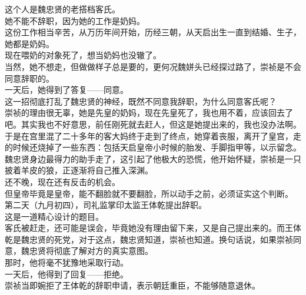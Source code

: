 \begin{multicols}{\theparacolNo}
这个人是魏忠贤的老搭档客氏。\\

她不能不辞职，因为她的工作是奶妈。\\

这份工作相当辛苦，从万历年间开始，历经三朝，从天启出生一直到结婚、生子，她都是奶妈。\\

现在喂奶的对象死了，想当奶妈也没辙了。\\

当然，她不想走，但做做样子总是要的，更何况魏姘头已经探过路了，崇祯是不会同意辞职的。\\

一天后，她得到了答复——同意。\\

这一招彻底打乱了魏忠贤的神经，既然不同意我辞职，为什么同意客氏呢？\\

崇祯的理由很无辜，她是先皇的奶妈，现在先皇死了，我也用不着，应该回去了吧。其实我也不好意思，前任刚死就去赶人，但这是她提出来的，我也没办法啊。\\

于是在宫里混了二十多年的客大妈终于走到了终点，她穿着丧服，离开了皇宫，走的时候还烧掉了一些东西：包括天启皇帝小时候的胎发、手脚指甲等，以示留念。\\

魏忠贤身边最得力的助手走了，这引起了他极大的恐慌，他开始怀疑，崇祯是一只披着羊皮的狼，正逐渐将自己推入深渊。\\

还不晚，现在还有反击的机会。\\

但皇帝毕竟是皇帝，能不翻脸就不要翻脸，所以动手之前，必须证实这个判断。\\

第二天（九月初四），司礼监掌印太监王体乾提出辞职。\\

这是一道精心设计的题目。\\

客氏被赶走，还可能是误会，毕竟她没有理由留下来，又是自己提出来的。而王体乾是魏忠贤的死党，对于这点，魏忠贤知道，崇祯也知道。换句话说，如果崇祯同意，魏忠贤将彻底了解对方的真实意图。\\

那时，他将毫不犹豫地采取行动。\\

一天后，他得到了回复——拒绝。\\

崇祯当即婉拒了王体乾的辞职申请，表示朝廷重臣，不能够随意退休。\\


\end{multicols}
